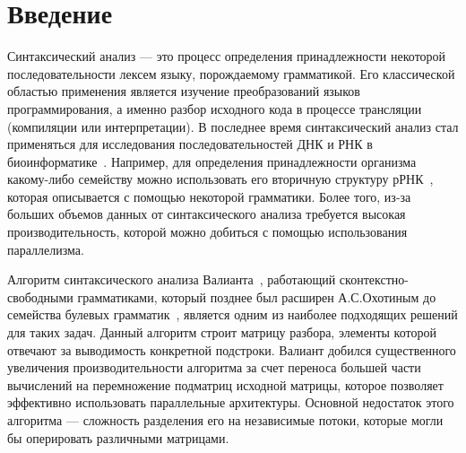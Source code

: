 \documentclass[14pt]{matmex-diploma}
\begin{document}
\renewcommand{\lstlistingname}{Листинг}
\renewcommand\listingscaption{Листинг}
\maketitle
\tableofcontents
\section*{Введение}
Синтаксический анализ --- это процесс определения принадлежности некоторой последовательности лексем языку, порождаемому грамматикой. Его классической областью применения является изучение преобразований языков программирования, а именно разбор исходного кода в процессе трансляции (компиляции или интерпретации). В последнее время синтаксический анализ стал применяться для исследования последовательностей ДНК и РНК в биоинформатике~\cite{RNA}. Например, для определения принадлежности организма какому-либо семейству можно использовать его вторичную структуру рРНК~\cite{secRNA}, которая описывается с помощью некоторой грамматики. Более того, из-за больших объемов данных от синтаксического анализа требуется высокая производительность, которой  можно добиться с помощью использования параллелизма.

Алгоритм синтаксического анализа Валианта~\cite{val}, работающий с\linebreak контекстно-свободными грамматиками, который позднее был расширен А.С.Охотиным до семейства булевых грамматик~\cite{okh}, является одним из наиболее подходящих решений для таких задач. Данный алгоритм строит матрицу разбора, элементы которой отвечают за выводимость конкретной подстроки. Валиант добился существенного увеличения производительности алгоритма за счет переноса большей части вычислений на перемножение подматриц исходной матрицы, которое позволяет эффективно использовать параллельные архитектуры. Основной недостаток этого алгоритма --- сложность разделения его на независимые потоки, которые могли бы оперировать различными матрицами.
\end{document}
